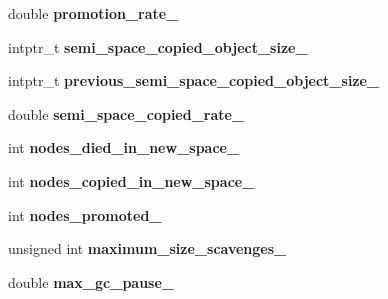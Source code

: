 \begin{DoxyCompactItemize}
\item 
double {\bfseries promotion\+\_\+rate\+\_\+}\hypertarget{classv8_1_1internal_1_1_heap_ae1f35475ae611a070d00cbb374a46042}{}\label{classv8_1_1internal_1_1_heap_ae1f35475ae611a070d00cbb374a46042}

\item 
intptr\+\_\+t {\bfseries semi\+\_\+space\+\_\+copied\+\_\+object\+\_\+size\+\_\+}\hypertarget{classv8_1_1internal_1_1_heap_af9f65b629fce462301869ff4fc4f6e38}{}\label{classv8_1_1internal_1_1_heap_af9f65b629fce462301869ff4fc4f6e38}

\item 
intptr\+\_\+t {\bfseries previous\+\_\+semi\+\_\+space\+\_\+copied\+\_\+object\+\_\+size\+\_\+}\hypertarget{classv8_1_1internal_1_1_heap_a0310681998cff2bc6b55b25c1412b54d}{}\label{classv8_1_1internal_1_1_heap_a0310681998cff2bc6b55b25c1412b54d}

\item 
double {\bfseries semi\+\_\+space\+\_\+copied\+\_\+rate\+\_\+}\hypertarget{classv8_1_1internal_1_1_heap_adc1198170e29963d1c32a0881396f511}{}\label{classv8_1_1internal_1_1_heap_adc1198170e29963d1c32a0881396f511}

\item 
int {\bfseries nodes\+\_\+died\+\_\+in\+\_\+new\+\_\+space\+\_\+}\hypertarget{classv8_1_1internal_1_1_heap_a8ce3f41fa8aa384bbfeecb8fbe653f7b}{}\label{classv8_1_1internal_1_1_heap_a8ce3f41fa8aa384bbfeecb8fbe653f7b}

\item 
int {\bfseries nodes\+\_\+copied\+\_\+in\+\_\+new\+\_\+space\+\_\+}\hypertarget{classv8_1_1internal_1_1_heap_a0c12d693943b8b31df791a5802cdacb9}{}\label{classv8_1_1internal_1_1_heap_a0c12d693943b8b31df791a5802cdacb9}

\item 
int {\bfseries nodes\+\_\+promoted\+\_\+}\hypertarget{classv8_1_1internal_1_1_heap_a92e4d9ce8321c39ca46b1dc754de1ad3}{}\label{classv8_1_1internal_1_1_heap_a92e4d9ce8321c39ca46b1dc754de1ad3}

\item 
unsigned int {\bfseries maximum\+\_\+size\+\_\+scavenges\+\_\+}\hypertarget{classv8_1_1internal_1_1_heap_a24f3fd9bf38a9bf5b8c99556252aa961}{}\label{classv8_1_1internal_1_1_heap_a24f3fd9bf38a9bf5b8c99556252aa961}

\item 
double {\bfseries max\+\_\+gc\+\_\+pause\+\_\+}\hypertarget{classv8_1_1internal_1_1_heap_a0a47535c8871931a9eb6e29e8ea7c500}{}\label{classv8_1_1internal_1_1_heap_a0a47535c8871931a9eb6e29e8ea7c500}


\end{DoxyCompactItemize}
